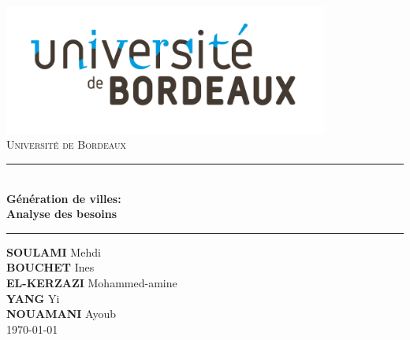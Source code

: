 \documentclass[12pt]{article}
\newcounter{besoin}
\begin{document}
\begin{center}

\includegraphics[width=0.8\textwidth]{images/logo.jpg}~\\[0.cm]

\textsc{\LARGE Université de Bordeaux}\\[1.5cm]



\noindent\rule{\textwidth}{3pt}
\\
{\huge \bfseries Génération de villes: \\ Analyse des besoins \\ [0.4cm] }
\noindent\rule{\textwidth}{3pt}



\bigskip
\textbf{ \Large SOULAMI}  \Large Mehdi \\
\textbf{ \Large BOUCHET }  \Large Ines \\
\textbf{ \Large EL-KERZAZI }  \Large Mohammed-amine \\
\textbf{ \Large YANG }  \Large Yi \\
\textbf{ \Large NOUAMANI }  \Large Ayoub \\
\vfill
{\large \today}
\end{center}

\newpage

\tableofcontents

\newpage





\newpage



\newpage



\newpage



\newpage



\newpage



\newpage



\newpage







\newpage


\end{document}
